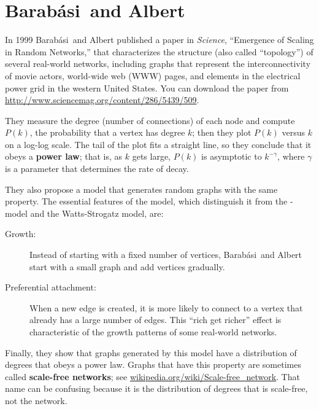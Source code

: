\documentclass[10pt]{book}
\begin{document}
\newcommand{\Barabasi}{Barab\'{a}si}

\section{\Barabasi~and Albert}
\label{scale.free}

In 1999 \Barabasi~and Albert published a paper in {\em Science},
``Emergence of Scaling in Random Networks,'' that characterizes the
structure (also called ``topology'') of several real-world networks,
including graphs that represent the interconnectivity of movie actors,
world-wide web (WWW) pages, and elements in the electrical power grid
in the western United States.  You can download the paper from
\url{http://www.sciencemag.org/content/286/5439/509}.
  

They measure the degree (number of connections) of each node and
compute $P(k)$, the probability that a vertex has degree $k$; then
they plot $P(k)$ versus $k$ on a log-log scale.  The tail of the plot
fits a straight line, so they conclude that it obeys a {\bf power
  law}; that is, as $k$ gets large, $P(k)$ is asymptotic to
$k^{- \gamma}$, where $\gamma$ is a parameter that determines the rate
of decay.

They also propose a model that generates random graphs with the same
property.  The essential features of the model, which distinguish it
from the \Erdos-\Renyi~ model and the Watts-Strogatz model, are:

\begin{description}

\item[Growth:]  Instead of starting with a fixed number of vertices,
\Barabasi~and Albert start with a small graph and add vertices gradually.

\item[Preferential attachment:] When a new edge is created, it is
more likely to connect to a vertex that already has a large number
of edges.  This ``rich get richer'' effect is characteristic of
the growth patterns of some real-world networks.

\end{description}

Finally, they show that graphs generated by this model have a
distribution of degrees that obeys a power law.  Graphs that
have this property are sometimes called {\bf scale-free networks};
see \url{wikipedia.org/wiki/Scale-free_network}.
That name can be confusing because it is the distribution
of degrees that is scale-free, not the network.
\end{document}
